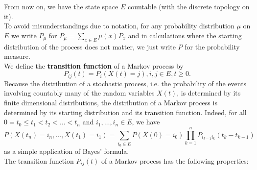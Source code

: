 \documentclass[12pt,a4paper]{scrartcl}
\numberwithin{equation}{section}
\begin{document}
From now on, we have the state space $E$ countable (with the discrete topology on it).\\[2ex]

To avoid misunderstandings due to notation, for any probability distribution $\mu$ on $E$ we write $P_{\mu}$ for $P_{\mu} = \sum_{x \in E} \mu\left(x\right) P_x$ and in calculations where the starting distribution of the process does not matter, we just write $P$ for the probability measure.\\[2ex]

We define the \textbf{transition function} of a Markov process by
\begin{equation}
P_{ij}\left(t\right) = P_i\left(X\left(t\right)=j \right), i,j \in E, t\geq 0. 
\end{equation}
Because the distribution of a stochastic process, i.e. the probability of the events involving countably many of the random variables $ X\left(t\right) $, is determined by its finite dimensional distributions, the distribution of a Markov process is determined by its starting distribution and its transition function. Indeed, for all $ 0 = t_0 \leq t_1 < t_2 < \ldots < t_n $ and $ i_1,\ldots,i_n \in E$, we have 
$$ P\left(X\left(t_n\right) = i_n, \ldots, X\left(t_1\right) = i_1\right) = \sum_{i_0 \in E} P\left(X\left(0\right) = i_0 \right) \prod_{k=1}^{n} P_{i_{k-1}i_k}\left(t_k - t_{k-1}\right) $$
as a simple application of Bayes' formula.\\



The transition function $P_{ij}\left(t\right)$ of a Markov process has the following properties:
\end{document}
